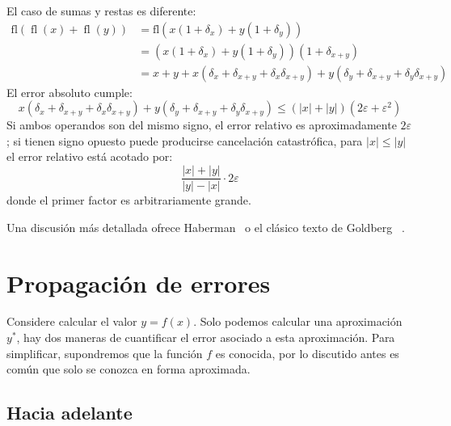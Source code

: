    El caso de sumas y restas es diferente:
   \begin{align*}
     \mathrm{fl}(\operatorname{fl}(x) + \operatorname{fl}(y))
       &= \mathrm{fl}(x (1 + \delta_x) + y (1 + \delta_y)) \\
       &= (x (1 + \delta_x) + y (1 + \delta_y)) (1 + \delta_{x + y}) \\
       &= x + y
            + x (\delta_x + \delta_{x + y} + \delta_x \delta_{x + y})
            + y (\delta_y + \delta_{x + y} + \delta_y \delta_{x + y})
   \end{align*}
   El error absoluto cumple:
   \begin{equation*}
     x (\delta_x + \delta_{x + y} + \delta_x \delta_{x + y})
       + y (\delta_y + \delta_{x + y} + \delta_y \delta_{x + y})
       \le (\lvert x \rvert + \lvert y \rvert) (2 \varepsilon + \varepsilon^2)
   \end{equation*}
   Si ambos operandos son del mismo signo,
   el error relativo es aproximadamente \(2 \varepsilon\);
   si tienen signo opuesto puede producirse cancelación catastrófica,
   para \(\lvert x \rvert \le \lvert y \rvert\)
   el error relativo está acotado por:
   \begin{equation*}
     \frac{\lvert x \rvert + \lvert y \rvert}
          {\lvert y \rvert - \lvert x \rvert}
       \cdot 2 \varepsilon
   \end{equation*}
   donde el primer factor es arbitrariamente grande.

   Una discusión más detallada ofrece Haberman~%
     \cite{haberman14:_float_point_demystified_part1,
           haberman16:_float_point_demystified_part2}
   o el clásico texto de Goldberg~%
     \cite{goldberg91:_what_every_cs_should_know_fp}.

\section{Propagación de errores}
\label{sec:propagacion-errores}

  Considere calcular el valor \(y = f(x)\).
  Solo podemos calcular una aproximación \(y^*\),
  hay dos maneras de cuantificar el error asociado a esta aproximación.
  Para simplificar,
  supondremos que la función \(f\) es conocida,
  por lo discutido antes es común que solo se conozca en forma aproximada.

\subsection{Hacia adelante}
\label{sec:error-adelante}

